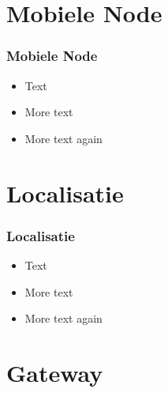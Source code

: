 

\maketitle

\section{Mobiele Node}

\begin{frame}[fragile]
\frametitle{Mobiele Node} 
\begin{itemize}
 \item Text
 \item More text
 \item More text again
\end{itemize}
\end{frame}


\section{Localisatie}

\begin{frame} 
\frametitle{Localisatie}
  \begin{itemize}
  \item Text
  \item More text
  \item More text again
  \end{itemize}
\end{frame}


\section{Gateway}

